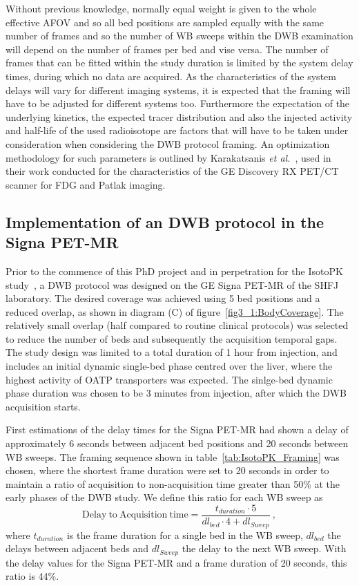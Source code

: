 Without previous knowledge, normally equal weight is given to the whole effective AFOV and so all bed positions are sampled equally with the same number of frames and so the number of WB sweeps within the DWB examination will depend on the number of frames per bed and vise versa. The number of frames that can be fitted within the study duration is limited by the system delay times, during which no data are acquired. As the characteristics of the system delays will vary for different imaging systems, it is expected that the framing will have to be adjusted for different systems too. Furthermore the expectation of the underlying kinetics, the expected tracer distribution and also the injected activity and half-life of the used radioisotope are factors that will have to be taken under consideration when considering the DWB protocol framing. 
An optimization methodology for such parameters is outlined by Karakatsanis \textit{et al.}~\cite{Karakatsanis2013}, used in their work conducted for the characteristics of the GE Discovery RX PET/CT scanner for FDG and Patlak imaging. 

\subsection{Implementation of an DWB protocol in the Signa PET-MR}
Prior to the commence of this PhD project and in perpetration for the IsotoPK study~\cite{Marie2019}, a DWB protocol was designed on the GE Signa PET-MR of the SHFJ laboratory. The desired coverage was achieved using 5 bed positions and a reduced overlap, as shown in diagram (C) of figure~\ref{fig3_1:BodyCoverage}. The relatively small overlap (half compared to routine clinical protocols) was selected to reduce the number of beds and subsequently the acquisition temporal gaps. The study design was limited to a total duration of 1 hour from injection, and includes an initial dynamic single-bed phase centred over the liver, where the highest activity of OATP transporters was expected. The sinlge-bed dynamic phase duration was chosen to be 3 minutes from injection, after which the DWB acquisition starts.

First estimations of the delay times for the Signa PET-MR had shown a delay of approximately 6 seconds between adjacent bed positions and 20 seconds between WB sweeps. The framing sequence shown in table~\ref{tab:IsotoPK_Framing} was chosen, where the shortest frame duration were set to 20 seconds in order to maintain a ratio of acquisition to non-acquisition time greater than 50\% at the early phases of the DWB study. We define this ratio for each WB sweep as
%
\begin{equation} \label{acq_to_dead_time}
\mathrm{Delay\ to\ Acquisition\ time} = \frac{t_{duration}\cdot 5 }{dl_{bed}\cdot 4 + dl_{Sweep}}  \ ,
\end{equation}
%
where $t_{duration}$ is the frame duration for a single bed in the WB sweep, $dl_{bed}$ the delays between adjacent beds and $dl_{Sweep}$ the delay to the next WB sweep. With the delay values for the Signa PET-MR and a frame duration of 20 seconds, this ratio is 44\%. 

